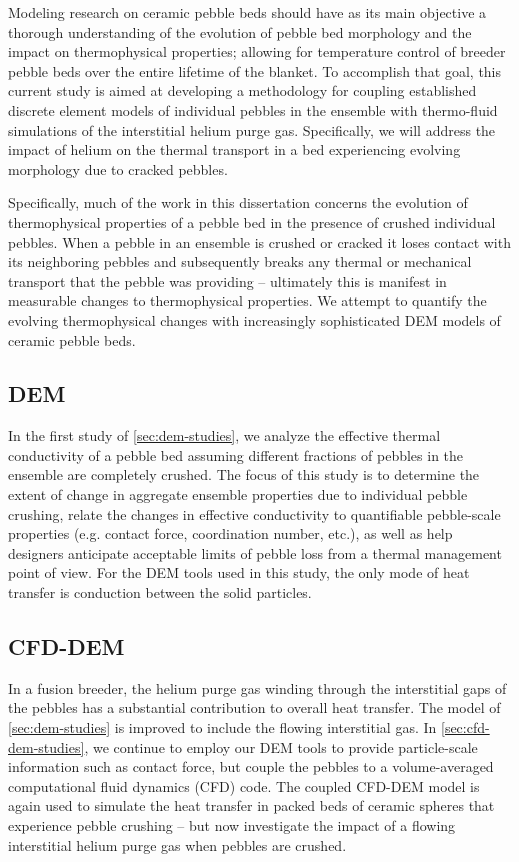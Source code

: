 Modeling research on ceramic pebble beds should have as its main objective a thorough understanding of the evolution of pebble bed morphology and the impact on thermophysical properties; allowing for temperature control of breeder pebble beds over the entire lifetime of the blanket. To accomplish that goal, this current study is aimed at developing a methodology for coupling established discrete element models of individual pebbles in the ensemble with thermo-fluid simulations of the interstitial helium purge gas. Specifically, we will address the impact of helium on the thermal transport in a bed experiencing evolving morphology due to cracked pebbles.

Specifically, much of the work in this dissertation concerns the evolution of thermophysical properties of a pebble bed in the presence of crushed individual pebbles. When a pebble in an ensemble is crushed or cracked it loses contact with its neighboring pebbles and subsequently breaks any thermal or mechanical transport that the pebble was providing -- ultimately this is manifest in measurable changes to thermophysical properties. We attempt to quantify the evolving thermophysical changes with increasingly sophisticated DEM models of ceramic pebble beds.


\subsection{DEM}
In the first study of \cref{sec:dem-studies}, we analyze the effective thermal conductivity of a pebble bed assuming different fractions of pebbles in the ensemble are completely crushed. The focus of this study is to determine the extent of change in aggregate ensemble properties due to individual pebble crushing, relate the changes in effective conductivity to quantifiable pebble-scale properties (e.g. contact force, coordination number, etc.), as well as help designers anticipate acceptable limits of pebble loss from a thermal management point of view. For the DEM tools used in this study, the only mode of heat transfer is conduction between the solid particles. 



\subsection{CFD-DEM}
In a fusion breeder, the helium purge gas winding through the interstitial gaps of the pebbles has a substantial contribution to overall heat transfer.\cite{Reimann:2002mi,Abou-Sena2005} The model of \cref{sec:dem-studies} is improved to include the flowing interstitial gas. In \cref{sec:cfd-dem-studies}, we continue to employ our DEM tools to provide particle-scale information such as contact force, but couple the pebbles to a volume-averaged computational fluid dynamics (CFD) code. The coupled CFD-DEM model is again used to simulate the heat transfer in packed beds of ceramic spheres that experience pebble crushing -- but now investigate the impact of a flowing interstitial helium purge gas when pebbles are crushed.



